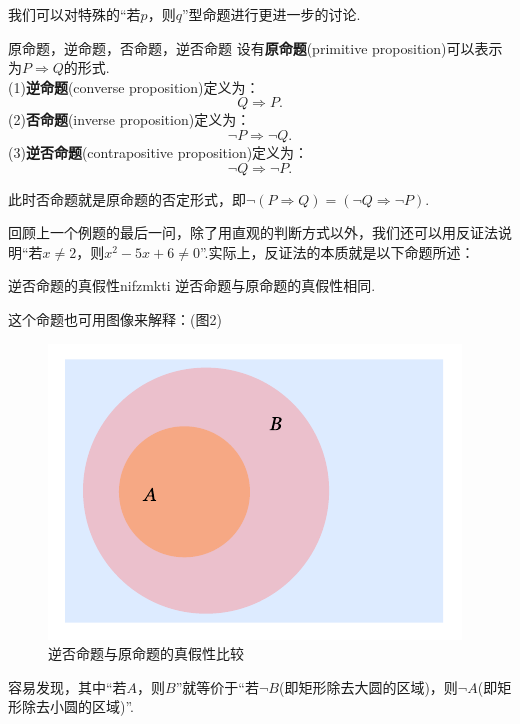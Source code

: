\documentclass[lang=cn, zihao=5]{elegantbook}
\begin{document}
我们可以对特殊的“若$p$，则$q$”型命题进行更进一步的讨论.

\begin{definition}{原命题，逆命题，否命题，逆否命题}
	设有\textbf{原命题}(primitive proposition)可以表示为$P \Rightarrow Q$的形式. \\
	(1)\textbf{逆命题}(converse proposition)定义为：$$Q \Rightarrow P.$$
	(2)\textbf{否命题}(inverse proposition)定义为：$$\neg P \Rightarrow \neg Q.$$
	(3)\textbf{逆否命题}(contrapositive proposition)定义为：$$\neg Q \Rightarrow \neg P.$$
\end{definition}
\begin{remark}
	此时否命题就是原命题的否定形式，即$\neg (P \Rightarrow Q) = (\neg Q \Rightarrow \neg P)$.
\end{remark}

回顾上一个例题的最后一问，除了用直观的判断方式以外，我们还可以用反证法说明“若$x \neq 2$，则$x^2-5x+6 \neq 0$”.实际上，反证法的本质就是以下命题所述：

\begin{theorem}{逆否命题的真假性}{nifzmkti}
	逆否命题与原命题的真假性相同.
\end{theorem}

这个命题也可用图像来解释：(图2)

\begin{figure}[h!]
	\centering
	\includegraphics{attachment/202302192.pdf}
	\caption{逆否命题与原命题的真假性比较}
\end{figure}

容易发现，其中“若$A$，则$B$”就等价于“若$\neg B$(即矩形除去大圆的区域)，则$\neg A$(即矩形除去小圆的区域)”.
\end{document}
